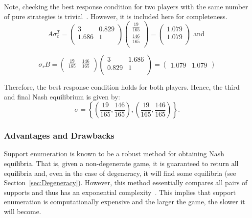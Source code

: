 Note, checking the best response condition for two players with the same number
of pure strategies is trivial~\cite{Knight2019}. However, it is included here for completeness.
\begin{displaymath}
    A\sigma_{c}^{T} = \begin{pmatrix}
        3 & 0.829 \\
        1.686 & 1 \\
    \end{pmatrix} \begin{pmatrix}
        \frac{19}{165} \\
        \frac{146}{165} \\
    \end{pmatrix} = \begin{pmatrix}
        1.079 \\
        1.079 \\
    \end{pmatrix} \text{   and   }
\end{displaymath}

\begin{displaymath}
    \sigma_{r}B = \begin{pmatrix}
        \frac{19}{165} & \frac{146}{165} \\
    \end{pmatrix} \begin{pmatrix}
        3 & 1.686 \\
        0.829 & 1 \\
    \end{pmatrix} = \begin{pmatrix}
        1.079 & 1.079
    \end{pmatrix}
\end{displaymath}

Therefore, the best response condition holds for both players. Hence, the third and final Nash equilibrium is given by:
\begin{displaymath}
    \sigma = \left \{ (\frac{19}{165}, \frac{146}{165}), (\frac{19}{165}, \frac{146}{165})\right \}.
\end{displaymath}


\subsubsection{Advantages and Drawbacks}\label{subsubsec:Adv_and_Drawbacks}
Support enumeration is known to be a robust method for obtaining Nash
equilibria. That is, given a non-degenerate game,
it is guaranteed to return all equilibria and, even in the case of degeneracy,
it will find some equilibria (see Section~\ref{sec:Degeneracy}). However, this method essentially
compares all pairs of supports and thus has an exponential complexity~\cite{Rampersaud2014}. This implies that support enumeration is
computationally expensive and the larger the game, the slower it will become.


